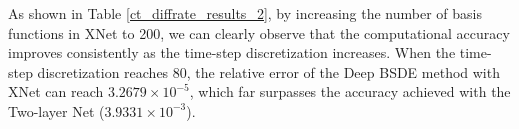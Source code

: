 \documentclass[11pt]{article}
\begin{document}
As shown in Table \ref{ct_diffrate_results_2}, by increasing the number of basis functions in XNet to 200, we can clearly observe that the computational accuracy improves consistently as the time-step discretization increases. When the time-step discretization reaches 80, the relative error of the Deep BSDE method with XNet can reach $3.2679 \times 10^{-5}$, which far surpasses the accuracy achieved with the Two-layer Net ($3.9331 \times 10^{-3}$). 
\begin{table}[htbp]
	\centering
	\caption{Numerical Results for solving PricingDiffrate Equation by XNet}
	\label{ct_diffrate_results_2}
\end{table}


\clearpage


 
\end{document}
